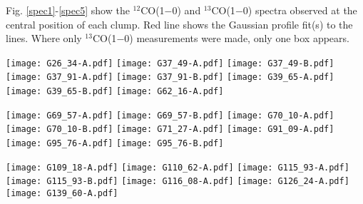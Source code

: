 \documentclass[printer]{aa}
\begin{document}
\begin{appendix}
Fig. \ref{spec1}-\ref{spec5} show the $^{12}$CO(1$-$0) and $^{13}$CO(1$-$0) spectra observed at the central position of each clump. Red line shows the Gaussian profile fit(s) to the lines. Where only $^{13}$CO(1$-$0) measurements were made, only one box appears. 

\begin{figure*}[th]
	\centering		
		\texttt{[image: G26\_34-A.pdf]}
		\texttt{[image: G37\_49-A.pdf]}
		\texttt{[image: G37\_49-B.pdf]}
		\texttt{[image: G37\_91-A.pdf]}
		\texttt{[image: G37\_91-B.pdf]}
		\texttt{[image: G39\_65-A.pdf]}
		\texttt{[image: G39\_65-B.pdf]}
		\texttt{[image: G62\_16-A.pdf]}
     \caption{$^{12}$CO(1$-$0) and $^{13}$CO(1$-$0) spectra at the central position of each observed clump. Red line shows the Gaussian profile fit(s) to the lines.}
	\label{spec1}
\end{figure*}
\begin{figure*}[th]
	\centering		
    	\texttt{[image: G69\_57-A.pdf]}
		\texttt{[image: G69\_57-B.pdf]}
		\texttt{[image: G70\_10-A.pdf]}
		\texttt{[image: G70\_10-B.pdf]}
		\texttt{[image: G71\_27-A.pdf]}
		\texttt{[image: G91\_09-A.pdf]}
		\texttt{[image: G95\_76-A.pdf]}
		\texttt{[image: G95\_76-B.pdf]}
    \caption{Cont. $^{12}$CO(1$-$0) and $^{13}$CO(1$-$0) spectra at the central position of each observed clump.}
	\label{spec2}
\end{figure*}
\begin{figure*}[th]
	\centering	
		\texttt{[image: G109\_18-A.pdf]}
        \texttt{[image: G110\_62-A.pdf]}
		\texttt{[image: G115\_93-A.pdf]}
		\texttt{[image: G115\_93-B.pdf]}
		\texttt{[image: G116\_08-A.pdf]}
		\texttt{[image: G126\_24-A.pdf]}
		\texttt{[image: G139\_60-A.pdf]}

\end{figure*}
\end{appendix}
\end{document}
